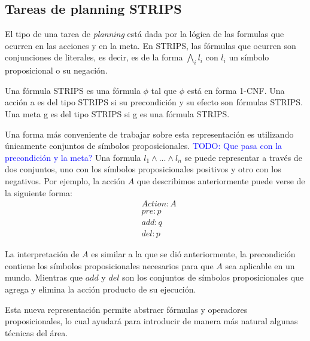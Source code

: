 \subsection{Tareas de planning STRIPS}

El tipo de una tarea de \emph{planning} está dada por la lógica de las formulas
que ocurren en las acciones y en la meta. En STRIPS, las fórmulas que ocurren
son conjunciones de literales, es decir, es de la forma $\bigwedge_i l_i$ con
$l_i$ un símbolo proposicional o su negación.

\begin{mydef}
    Una fórmula STRIPS es una fórmula $\phi$ tal que $\phi$ está en forma 1-CNF.
    Una acción a es del tipo STRIPS si su precondición y su efecto son fórmulas
    STRIPS. Una meta g es del tipo STRIPS si g es una fórmula STRIPS.
\end{mydef}

Una forma más conveniente de trabajar sobre esta representación es utilizando
únicamente conjuntos de símbolos proposicionales. \textcolor{blue}{TODO: Que
pasa con la precondición y la meta?} Una formula $l_1 \land ... \land l_n$ se
puede representar a través de dos conjuntos, uno con los símbolos
proposicionales positivos y otro con los negativos. Por ejemplo, la acción $A$
que describimos anteriormente puede verse de la siguiente forma:
\begin{align*}
    & Action : A \\
    & pre : p \\
    & add : q \\
    & del : p
\end{align*}

La interpretación de $A$ es similar a la que se dió anteriormente, la
precondición contiene los símbolos proposicionales necesarios para que $A$ sea
aplicable en un mundo. Mientras que $add$ y $del$ son los conjuntos de símbolos
proposicionales que agrega y elimina la acción producto de su ejecución.

Esta nueva representación permite abstraer fórmulas y operadores
proposicionales, lo cual ayudará para introducir de manera más natural algunas
técnicas del área.

